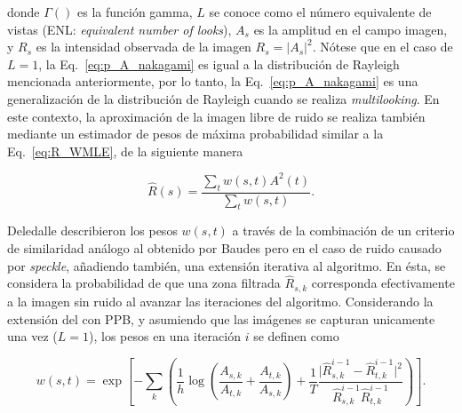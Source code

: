 \noindent donde $\Gamma()$ es la función gamma, $L$ se conoce como el número equivalente de vistas (ENL: \textit{equivalent number of looks}), $A_s$ es la amplitud en el campo imagen, y $R_s$ es la intensidad observada de la imagen $R_s = \lvert A_s \rvert^2$. Nótese que en el caso de $L=1$, la Eq.~\ref{eq:p_A_nakagami} es igual a la distribución de Rayleigh mencionada anteriormente, por lo tanto, la Eq.~\ref{eq:p_A_nakagami} es una generalización de la distribución de Rayleigh cuando se realiza \textit{multilooking}. En este contexto, la aproximación de la imagen libre de ruido se realiza también mediante un estimador de pesos de máxima probabilidad similar a la Eq.~\ref{eq:R_WMLE}, de la siguiente manera

\begin{equation}
\hat{R}(s) = \frac{\sum_t w(s,t) A^2(t)}{\sum_t w(s,t)}.
\end{equation}

Deledalle \etal \cite{Deledalle2009} describieron los pesos $w(s,t)$ a través de la combinación de un criterio de similaridad análogo al obtenido por Baudes \etal pero en el caso de ruido causado por \textit{speckle}, añadiendo también, una extensión iterativa al algoritmo. En ésta, se considera la probabilidad de que una zona filtrada $\hat{R}_{s,k}$ corresponda efectivamente a la imagen sin ruido al avanzar las iteraciones del algoritmo. Considerando la extensión del \nlmeans con PPB, y asumiendo que las imágenes se capturan unicamente una vez ($L=1$), los pesos en una iteración $i$ se definen como \cite{Deledalle2009}


\begin{equation}
\label{eq:nlmeans_w}
w(s,t) = \exp \left[-\sum_{k} \left( \frac{1}{h} \log \left(\frac{A_{s,k}}{A_{t,k}} + \frac{A_{t,k}}{A_{s,k}}\right) + \frac{1}{T} \frac{\big\lvert\hat{R}^{i-1}_{s,k} - \hat{R}^{i-1}_{t,k}\big\rvert^2}{\hat{R}^{i-1}_{s,k}\hat{R}^{i-1}_{t,k}} \right)\right].
\end{equation}

